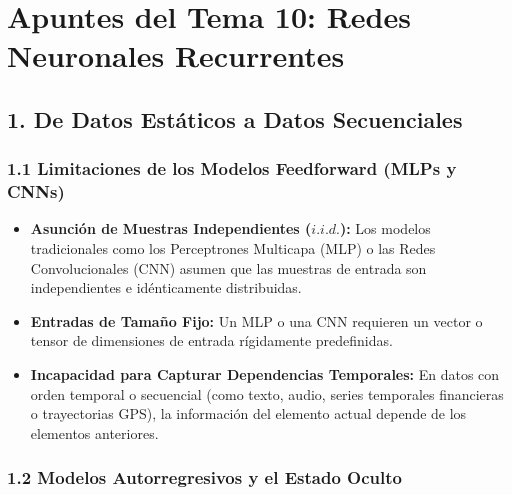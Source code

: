 \documentclass[11pt,oneside]{article}
\begin{document}
\tableofcontents
\clearpage
{}
\section{Apuntes del Tema 10: Redes Neuronales Recurrentes}

\subsection{1. De Datos Estáticos a Datos Secuenciales}

\subsubsection{1.1 Limitaciones de los Modelos Feedforward (MLPs y CNNs)}

\begin{itemize}

\item \textbf{Asunción de Muestras Independientes (\(i.i.d.\)):} Los modelos tradicionales como los Perceptrones Multicapa (MLP) o las Redes Convolucionales (CNN) asumen que las muestras de entrada son independientes e idénticamente distribuidas.

\end{itemize}

\begin{itemize}

\item \textbf{Entradas de Tamaño Fijo:} Un MLP o una CNN requieren un vector o tensor de dimensiones de entrada rígidamente predefinidas.

\end{itemize}

\begin{itemize}

\item \textbf{Incapacidad para Capturar Dependencias Temporales:} En datos con orden temporal o secuencial (como texto, audio, series temporales financieras o trayectorias GPS), la información del elemento actual depende de los elementos anteriores.

\end{itemize}

\subsubsection{1.2 Modelos Autorregresivos y el Estado Oculto}
\end{document}
